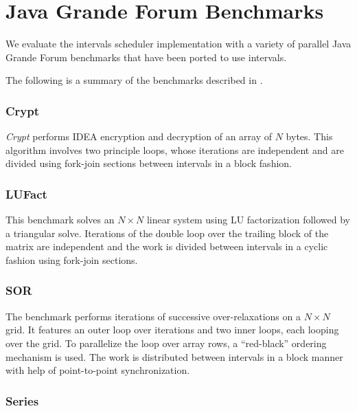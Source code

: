 
\chapter{Java Grande Forum Benchmarks}
\label{chap:appendix-benchmarks}

We evaluate the intervals scheduler implementation with a variety of
parallel Java Grande Forum benchmarks \cite{Smith2001, Mathew1999,
  Gregg2003} that have been ported to use intervals.

The following is a summary of the benchmarks described in
\cite{Smith2001, Mathew1999, Gregg2003}.

\subsection*{Crypt}

\emph{Crypt} performs IDEA encryption and decryption of an array of
$N$ bytes. This algorithm involves two principle loops, whose
iterations are independent and are divided using fork-join sections
between intervals in a block fashion.

\subsection*{LUFact}

This benchmark solves an $N \times N$ linear system using LU
factorization followed by a triangular solve. Iterations of the double
loop over the trailing block of the matrix are independent and the
work is divided between intervals in a cyclic fashion using fork-join
sections.

\subsection*{SOR}

The benchmark performs iterations of successive over-relaxations on a
$N \times N$ grid. It features an outer loop over iterations and two
inner loops, each looping over the grid. To parallelize the loop over
array rows, a ``red-black'' ordering mechanism is used. The work is
distributed between intervals in a block manner with help of
point-to-point synchronization.

\subsection*{Series}

